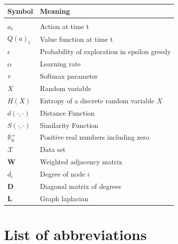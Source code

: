 \documentclass[12pt,a4paper,bibliography=totocnumbered,listof=totocnumbered]{scrartcl}
\begin{document}
\begin{tabular}{p{6cm}p{9cm}}
\textbf{Symbol} 		& 		\textbf{Meaning} \\
\midrule
\vspace{0.3cm} & \vspace{0.3cm} 			\\
$a_t$				  & Action at time t			\\
$Q(a)_t$	& Value function at time t \\
$\epsilon$			& Probability of exploration in epsilon greedy \\
$\alpha$ & Learning rate \\ 
$\tau$ & Softmax parameter \\
$X$ & Random variable \\
$H(X) $ &  Entropy of a  discrete random variable $X$ \\ 
$d(\cdot,\cdot)$ & Distance Function \\
$S(\cdot,\cdot)$ & Similarity Function \\
$ \mathbb{R}_0^+$ & Positive real numbers including zero \\
$\mathcal{X}$ & Data set \\ 
\textbf{W} & Weighted adjacency matrix \\
$d_i$ & Degree of node $i$ \\
\textbf{D} & Diagonal matrix of degrees \\
\textbf{L} & Graph laplacian \\
\end{tabular}

\pagebreak


\section{List of abbreviations}
\end{document}
